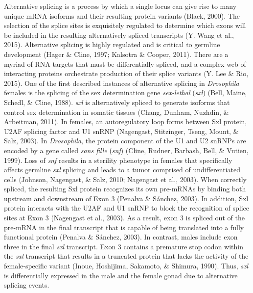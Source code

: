 \documentclass[12pt,oneside]{reedthesis}
\begin{document}
Alternative splicing is a process by which a single locus can give rise
to many unique mRNA isoforms and their resulting protein variants
(Black, 2000). The selection of the splice sites is exquisitely
regulated to determine which exons will be included in the resulting
alternatively spliced transcripts (Y. Wang et al., 2015). Alternative splicing
is highly regulated and is critical to germline development
(Hager \& Cline, 1997; Kalsotra \& Cooper, 2011). There are a myriad of RNA targets that
must be differentially spliced, and a complex web of interacting
proteins orchestrate production of their splice variants (Y. Lee \& Rio, 2015).
One of the first described instances of alternative splicing in
\emph{Drosophila} females is the splicing of the sex determination gene
\emph{sex-lethal} (\emph{sxl}) (Bell, Maine, Schedl, \& Cline, 1988). \emph{sxl} is alternatively spliced to
generate isoforms that control sex determination in somatic tissues
(Chang, Dunham, Nuzhdin, \& Arbeitman, 2011). In females, an autoregulatory loop forms between Sxl
protein, U2AF splicing factor and U1 snRNP (Nagengast, Stitzinger, Tseng, Mount, \& Salz, 2003). In
\emph{Drosophila}, the protein component of the U1 and U2 snRNPs are encoded
by a gene called \emph{sans fille} (\emph{snf}) (Cline, Rudner, Barbash, Bell, \& Vutien, 1999). Loss of \emph{snf}
results in a sterility phenotype in females that specifically affects
germline \emph{sxl} splicing and leads to a tumor comprised of
undifferentiated cells (Johnson, Nagengast, \& Salz, 2010; Nagengast et al., 2003). When
correctly spliced, the resulting Sxl protein recognizes its own
pre-mRNAs by binding both upstream and downstream of Exon 3
(Penalva \& Sánchez, 2003). In addition, Sxl protein interacts with the U2AF and
U1 snRNP to block the recognition of splice sites at Exon 3
(Nagengast et al., 2003). As a result, exon 3 is spliced out of the pre-mRNA
in the final transcript that is capable of being translated into a fully
functional protein (Penalva \& Sánchez, 2003). In contrast, males include exon
three in the final \emph{sxl} transcript. Exon 3 contains a premature stop
codon within the \emph{sxl} transcript that results in a truncated protein
that lacks the activity of the female-specific variant (Inoue, Hoshijima, Sakamoto, \& Shimura, 1990).
Thus, \emph{sxl} is differentially expressed in the male and the female gonad
due to alternative splicing events.
\end{document}
